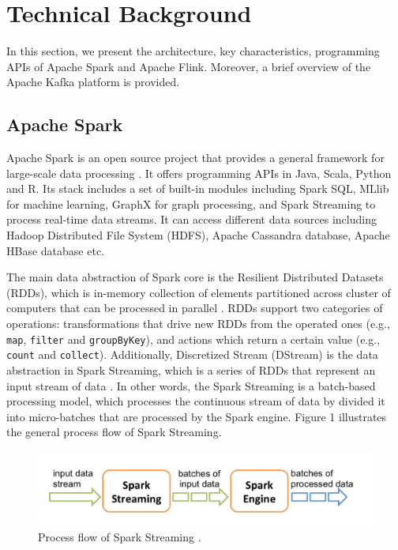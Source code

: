 \documentclass[]{article}
\begin{document}
\section{Technical Background}
 In this section, we present the architecture, key characteristics, programming APIs  of Apache Spark and Apache Flink. Moreover, a brief overview of the Apache Kafka platform is  provided.

\subsection{Apache Spark}

\par Apache Spark is an open source project that provides a general framework for large-scale data processing \cite{spark}. It offers programming APIs in Java, Scala, Python and R. Its stack includes a set of built-in modules including Spark SQL, MLlib for machine learning, GraphX for graph processing, and Spark Streaming to process real-time data streams. It can access different data sources including Hadoop Distributed File System (HDFS), Apache Cassandra database, Apache HBase database etc.

\par The main data abstraction of Spark core is the Resilient Distributed Datasets (RDDs), which is in-memory collection of elements partitioned across cluster of computers that can be processed in parallel \cite{rdd}. RDDs support two categories of operations: transformations that drive new RDDs from the operated ones (e.g., \texttt{map}, \texttt{filter} and \texttt{groupByKey}), and actions which return a certain value (e.g., \texttt{count} and \texttt{collect}). Additionally, Discretized Stream (DStream) is the data abstraction in Spark Streaming, which is a series of RDDs that represent an input stream of data \cite{spark_streaming}. In other words, the Spark Streaming is a batch-based processing model, which processes the continuous stream of data by divided it into micro-batches that are  processed by the Spark engine. Figure 1 illustrates the general process flow of Spark Streaming. 


\begin{figure}[h]
 
  \centering
    \includegraphics[width=.9\textwidth, height=.2\textheight]{streaming-flow.png}
     \caption{ Process flow of Spark Streaming \cite{spark_streaming}.}
\end{figure} 
\end{document}
